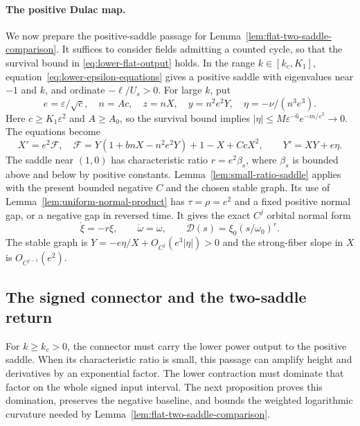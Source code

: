 \paragraph{The positive Dulac map.}
We now prepare the positive-saddle passage for
Lemma~\ref{lem:flat-two-saddle-comparison}.
It suffices to consider fields admitting a counted cycle, so that the
survival bound in \eqref{eq:lower-flat-output} holds.
In the range $k\in[k_c,K_1]$, equation~\eqref{eq:lower-epsilon-equations}
gives a positive saddle with eigenvalues near $-1$ and $k$, and ordinate
$-\ell/U_s>0$. For large $k$, put
\begin{equation}\label{eq:lower-small-ratio}
 e=\varepsilon/\sqrt c,\quad n=Ac,\quad
 z=nX,\quad y=n^2e^2Y,\quad \eta=-\nu/(n^3e^3).
\end{equation}
Here $c\ge K_1\varepsilon^2$ and $A\ge A_0$, so the survival bound
implies $|\eta|\le M\varepsilon^{-6}e^{-m/\varepsilon^2}\to0$.
The equations become
\[
 X'=e^2\mathcal F,\quad
 \mathcal F=Y(1+bnX-n^2e^2Y)+1-X+CcX^2,\qquad
 Y'=XY+e\eta.
\]
The saddle near $(1,0)$ has characteristic ratio $r=e^2\beta_s$,
where $\beta_s$ is bounded above and below by positive constants.
Lemma~\ref{lem:small-ratio-saddle} applies with the present bounded
negative $C$ and the chosen stable graph. Its use of
Lemma~\ref{lem:uniform-normal-product} has $\tau=\rho=e^2$ and a
fixed positive normal gap, or a negative gap in reversed time. It gives
the exact $C^j$ orbital normal form
\begin{equation}\label{eq:lower-positive-product}
 \dot\xi=-r\xi,\qquad\dot\omega=\omega,\qquad
 \mathcal D(s)=\xi_0(s/\omega_0)^r.
\end{equation}
The stable graph is $Y=-e\eta/X+O_{C^j}(e^3|\eta|)>0$ and the
strong-fiber slope in $X$ is $O_{C^{j-1}}(e^2)$.


\subsection{The signed connector and the two-saddle return}

For $k\ge k_c>0$, the connector must carry the lower power output to the
positive saddle. When its characteristic ratio is small, this passage
can amplify height and derivatives by an exponential factor. The lower
contraction must dominate that factor on the whole signed input interval.
The next proposition proves this domination, preserves the negative
baseline, and bounds the weighted logarithmic curvature needed by
Lemma~\ref{lem:flat-two-saddle-comparison}.

